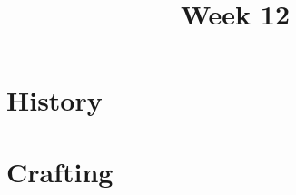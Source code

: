 \documentclass[11pt]{article}
\title{Week 12}
\date{}
\begin{document}
    \maketitle

    \section*{History}
        \begin{itemize}
        \end{itemize}

    \section*{Crafting}
        \begin{itemize}
        \end{itemize}
\end{document}
